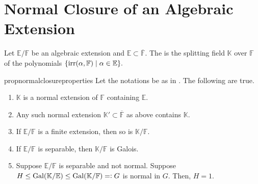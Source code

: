 \chapter{Normal Closure of an Algebraic Extension}

\begin{defn}%
	\label{defn:normalclosure}
	Let $\mathbb{E}/\mathbb{F}$ be an algebraic extension and $\mathbb{E} \subset \overline{\mathbb{F}}.$ The  is the splitting field $\mathbb{K}$ over $\mathbb{F}$ of the polynomials $\{\operatorname{irr}(\alpha, \mathbb{F}) \mid \alpha \in \mathbb{E}\}.$
\end{defn}

\begin{restatable}[]{prop}{normalclosureproperties}
\label{prop:normalclosureproperties}
	Let the notations be as in . The following are true.
	\begin{enumerate}
	 	\item $\mathbb{K}$ is a normal extension of $\mathbb{F}$ containing $\mathbb{E}.$
	 	\item Any such normal extension $\mathbb{K}' \subset \overline{\mathbb{F}}$ as above contains $\mathbb{K}.$
	 	\item If $\mathbb{E}/\mathbb{F}$ is a finite extension, then so is $\mathbb{K}/\mathbb{F}.$
	 	\item If $\mathbb{E}/\mathbb{F}$ is separable, then $\mathbb{K}/\mathbb{F}$ is Galois.
	 	\item Suppose $\mathbb{E}/\mathbb{F}$ is separable and not normal. Suppose $H \le \operatorname{Gal}(\mathbb{K}/\mathbb{E}) \le \operatorname{Gal}(\mathbb{K}/\mathbb{F}) =\vcentcolon G$ is normal in $G.$ Then, $H = 1.$ \hfill\hyperref[prop:normalclosureproperties2]{\downsym}
	 \end{enumerate} 
\end{restatable}